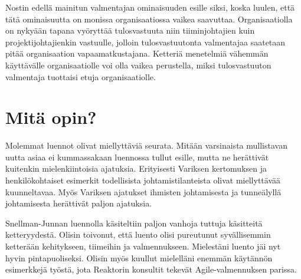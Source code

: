 \documentclass[a4paper]{article}
\begin{document}
Nostin edellä mainitun valmentajan ominaisuuden esille siksi, koska luulen, että tätä ominaisuutta on monissa organisaatiossa vaikea saavuttaa. Organisaatiolla on nykyään tapana vyöryttää tulosvastuuta niin tiiminjohtajien kuin projektijohtajienkin vastuulle, jolloin tulosvastuutonta valmentajaa saatetaan pitää organisaation vapaamatkustajana. Ketteriä menetelmiä vähemmän käyttävälle organisaatiolle voi olla vaikea perustella, miksi tulosvastuuton valmentaja tuottaisi etuja organisaatiolle.

\section{Mitä opin?}

Molemmat luennot olivat miellyttäviä seurata. Mitään varsinaista mullistavan uutta asiaa ei kummassakaan luennossa tullut esille, mutta ne herättivät kuitenkin mielenkiintoisia ajatuksia. Erityisesti Variksen kertomuksen ja henkilökohtaiset esimerkit todellisista johtamistilanteista olivat miellyttävää kuunneltavaa. Myös Variksen ajatukset ihmisten johtamisesta ja tunneälyllä johtamisesta herättivät paljon ajatuksia. 

Snellman-Junnan luennolla käsiteltiin paljon vanhoja tuttuja käsitteitä ketteryydestä. Olisin toivonut, että luento olisi pureutunut syvällisemmin ketterään kehitykseen, tiimeihin ja valmennukseen. Mielestäni luento jäi nyt hyvin pintapuoliseksi. Olisin myös kuullut mielelläni enemmän käytännön esimerkkejä työstä, jota Reaktorin konsultit tekevät Agile-valmennuksen parissa.


% 

% 
% 
\end{document}
